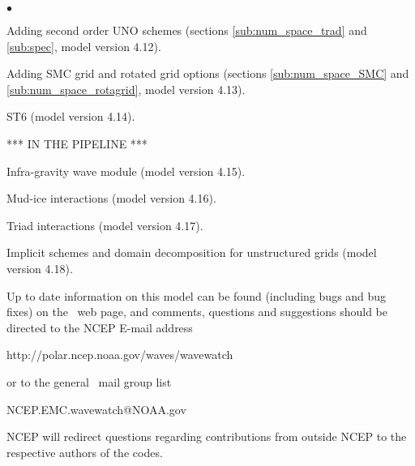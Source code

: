 \begin{list}{$\bullet$}{\rightmargin 5mm \parsep 0mm \itemsep 0mm}
\item Adding second order UNO schemes (sections \ref{sub:num_space_trad} and
  \ref{sub:spec}, model version 4.12).

\item Adding SMC grid and rotated grid options (sections
  \ref{sub:num_space_SMC} and \ref{sub:num_space_rotagrid}, model version
  4.13).

\item ST6 (model version 4.14).

\vspace{\baselineskip}
\centerline{*** IN THE PIPELINE ***}
\vspace{\baselineskip}

\item Infra-gravity wave module (model version 4.15).

\item Mud-ice interactions (model version 4.16).

\item Triad interactions (model version 4.17).

\item Implicit schemes and domain decomposition for unstructured grids (model
  version 4.18).
\end{list}

\vspace{\baselineskip} \noindent 
Up to date information on this model can be found (including bugs and bug
fixes) on the \ws\ web page, and comments, questions and suggestions should be
directed to the NCEP E-mail address

\begin{center}
http://polar.ncep.noaa.gov/waves/wavewatch
\end{center}

\noindent
or to the general \ws\ mail group list

\begin{center}
NCEP.EMC.wavewatch@NOAA.gov
\end{center}

\noindent
NCEP will redirect questions regarding contributions from outside NCEP to the
respective authors of the codes.
